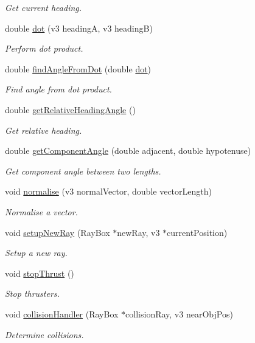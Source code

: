 \begin{DoxyCompactItemize}
\begin{DoxyCompactList}\small\item\em Get current heading. \end{DoxyCompactList}\item 
double \mbox{\hyperlink{classNavAP_a13408e123d8040a572f03a7b3d363b54}{dot}} (v3 headingA, v3 headingB)
\begin{DoxyCompactList}\small\item\em Perform dot product. \end{DoxyCompactList}\item 
double \mbox{\hyperlink{classNavAP_a5949a1ac7aef3f5f453c2813347eec10}{find\+Angle\+From\+Dot}} (double \mbox{\hyperlink{classNavAP_a13408e123d8040a572f03a7b3d363b54}{dot}})
\begin{DoxyCompactList}\small\item\em Find angle from dot product. \end{DoxyCompactList}\item 
double \mbox{\hyperlink{classNavAP_a642bd070e1487f14e3ced7eea42784b9}{get\+Relative\+Heading\+Angle}} ()
\begin{DoxyCompactList}\small\item\em Get relative heading. \end{DoxyCompactList}\item 
double \mbox{\hyperlink{classNavAP_a5b24e0f32a4068c21a3c2c474c1a9ddd}{get\+Component\+Angle}} (double adjacent, double hypotenuse)
\begin{DoxyCompactList}\small\item\em Get component angle between two lengths. \end{DoxyCompactList}\item 
void \mbox{\hyperlink{classNavAP_ab88867c5e101748bd881f9bd48b03f38}{normalise}} (v3 normal\+Vector, double vector\+Length)
\begin{DoxyCompactList}\small\item\em Normalise a vector. \end{DoxyCompactList}\item 
void \mbox{\hyperlink{classNavAP_ac1e6cebd415ba734ad897ebdc02b249a}{setup\+New\+Ray}} (Ray\+Box $\ast$new\+Ray, v3 $\ast$current\+Position)
\begin{DoxyCompactList}\small\item\em Setup a new ray. \end{DoxyCompactList}\item 
void \mbox{\hyperlink{classNavAP_a5070e1a7fd9a3a118acf7345a6bcbdd4}{stop\+Thrust}} ()
\begin{DoxyCompactList}\small\item\em Stop thrusters. \end{DoxyCompactList}\item 
void \mbox{\hyperlink{classNavAP_a092a772bdb4058bb4903f1e5d14e8287}{collision\+Handler}} (Ray\+Box $\ast$collision\+Ray, v3 near\+Obj\+Pos)
\begin{DoxyCompactList}\small\item\em Determine collisions. \end{DoxyCompactList}\end{DoxyCompactItemize}
